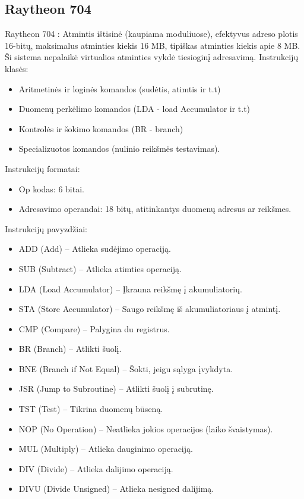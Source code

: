 \documentclass{article}
\begin{document}
\subsection*{Raytheon 704}
Raytheon 704 : Atmintis ištisinė (kaupiama moduliuose), efektyvus adreso plotis 16-bitų, maksimalus atminties kiekis 16 MB, tipiškas atminties kiekis apie 8 MB. Ši sistema nepalaikė virtualios atminties vykdė tiesioginį adresavimą.
Instrukcijų klasės:
\begin{itemize}
    \item Aritmetinės ir loginės komandos (sudėtis, atimtis ir t.t)
     \item Duomenų perkėlimo komandos (LDA - load Accumulator ir t.t)
    \item Kontrolės ir šokimo komandos (BR - branch)
    \item Specializuotos komandos (nulinio reikšmės testavimas).
\end{itemize}
Instrukcijų formatai:
\begin{itemize}
    \item Op kodas: 6 bitai.
    \item Adresavimo operandai: 18 bitų, atitinkantys duomenų adresus ar reikšmes.
\end{itemize}
Instrukcijų pavyzdžiai:
\begin{itemize}
    \item ADD (Add) – Atlieka sudėjimo operaciją.
    \item SUB (Subtract) – Atlieka atimties operaciją.
    \item LDA (Load Accumulator) – Įkrauna reikšmę į akumuliatorių.
    \item STA (Store Accumulator) – Saugo reikšmę iš akumuliatoriaus į atmintį.
    \item CMP (Compare) – Palygina du registrus.
    \item BR (Branch) – Atlikti šuolį.
    \item BNE (Branch if Not Equal) – Šokti, jeigu sąlyga įvykdyta.
    \item JSR (Jump to Subroutine) – Atlikti šuolį į subrutinę.
    \item TST (Test) – Tikrina duomenų būseną.
    \item NOP (No Operation) – Neatlieka jokios operacijos (laiko švaistymas).
    \item MUL (Multiply) – Atlieka dauginimo operaciją.
    \item DIV (Divide) – Atlieka dalijimo operaciją.
    \item DIVU (Divide Unsigned) – Atlieka nesigned dalijimą.
\end{itemize}
\end{document}
